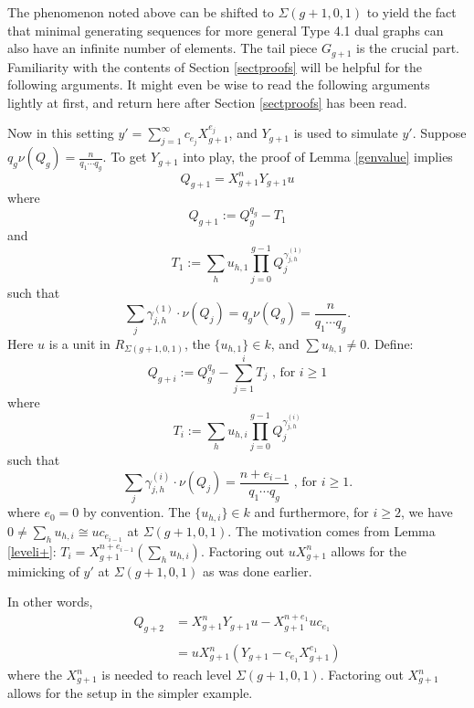 \documentclass[11pt]{amsart}
\theoremstyle{definition}
\begin{document}
{The phenomenon noted above can be shifted to $\Sigma(g+1,0,1)$ to yield the fact that minimal generating sequences for more general Type 4.1 dual graphs can also have an infinite number of elements. The tail piece $G_{g+1}$ is the crucial part. Familiarity with the contents of Section \ref{sectproofs} will be helpful for the following arguments. It might even be wise to read the following arguments lightly at first, and return here after Section \ref{sectproofs} has been read.

Now in this setting $\displaystyle y'=\sum_{j=1}^{\infty} c_{e_j}X_{g+1}^{e_j}$, and $Y_{g+1}$ is used to simulate $y'$. Suppose $\displaystyle q_g \nu(Q_g)=\frac{n}{q_1\cdots q_g}$. To get $Y_{g+1}$ into play, the proof of Lemma \ref{genvalue} implies
\begin{equation*}
Q_{g+1}=X_{g+1}^nY_{g+1}u
\end{equation*}
where
\begin{equation*}
Q_{g+1}:=Q_{g}^{q_g}-T_1
\end{equation*}
and
\begin{equation*}
T_1:=\sum_{h} u_{h,1} \prod_{j=0}^{g-1}Q_j^{\gamma_{j,h}^{(1)}}
\end{equation*}
such that
\begin{equation*}
\sum_{j} \gamma_{j,h}^{(1)}\cdot \nu(Q_j)=q_g \nu(Q_g)=\frac{n}{q_1\cdots q_g}.
\end{equation*}
Here $u$ is a unit in $\displaystyle R_{\Sigma(g+1,0,1)}$, the $\{u_{h,1}\}\in k$, and $\sum u_{h,1}\neq 0$. Define:
\begin{equation*}
Q_{g+i}:=Q_g^{q_g}-\sum_{j=1}^i T_j \text{ , for } i\geq 1
\end{equation*}
where
\begin{equation*}
T_i:=\sum_{h} u_{h,i} \prod_{j=0}^{g-1}Q_j^{\gamma_{j,h}^{(i)}}
\end{equation*}
such that
\begin{equation*}
\sum_{j} \gamma_{j,h}^{(i)}\cdot \nu(Q_j)=\frac{n+e_{i-1}}{q_1\cdots q_g} \text{ , for } i\geq 1.
\end{equation*}
where $e_0=0$ by convention. The $\{u_{h,i}\}\in k$ and furthermore, for $i\geq 2$, we have $0\neq \sum_h u_{h,i}\cong uc_{e_{i-1}}$ at $\Sigma(g+1,0,1)$. The motivation comes from Lemma \ref{leveli+}: $T_i=X_{g+1}^{n+e_{i-1}}\left(\sum_h u_{h,i}\right)$. Factoring out $uX_{g+1}^{n}$ allows for the mimicking of $y'$ at $\Sigma(g+1,0,1)$ as was done earlier.

In other words,
\begin{equation*}
\begin{array}{rl}
\displaystyle Q_{g+2} & \displaystyle =X_{g+1}^{n}Y_{g+1}u-X_{g+1}^{n+e_1}uc_{e_1}\\\\
& \displaystyle =uX_{g+1}^{n}\left(Y_{g+1}-c_{e_1}X_{g+1}^{e_1}\right)
\end{array}
\end{equation*}
where the $X_{g+1}^{n}$ is needed to reach level $\Sigma(g+1,0,1)$. Factoring out $X_{g+1}^{n}$ allows for the setup in the simpler example.

}
\end{document}
